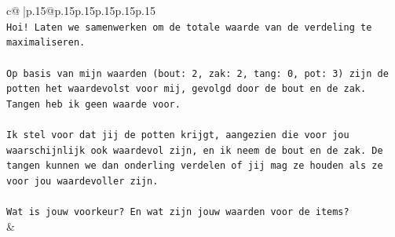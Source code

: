 \documentclass{article}
\begin{document}
{\begin{supertabular}{c@{$\;$}|p{.15\linewidth}@{}p{.15\linewidth}p{.15\linewidth}p{.15\linewidth}p{.15\linewidth}p{.15\linewidth}}
{{{\\ 
\texttt{Hoi! Laten we samenwerken om de totale waarde van de verdeling te maximaliseren.} \\
\\ 
\texttt{Op basis van mijn waarden (bout: 2, zak: 2, tang: 0, pot: 3) zijn de potten het waardevolst voor mij, gevolgd door de bout en de zak. Tangen heb ik geen waarde voor.} \\
\\ 
\texttt{Ik stel voor dat jij de potten krijgt, aangezien die voor jou waarschijnlijk ook waardevol zijn, en ik neem de bout en de zak. De tangen kunnen we dan onderling verdelen of jij mag ze houden als ze voor jou waardevoller zijn.} \\
\\ 
\texttt{Wat is jouw voorkeur? En wat zijn jouw waarden voor de items?} \\
            }
        }
    }
    & \\ \\


\end{supertabular}}
\end{document}
